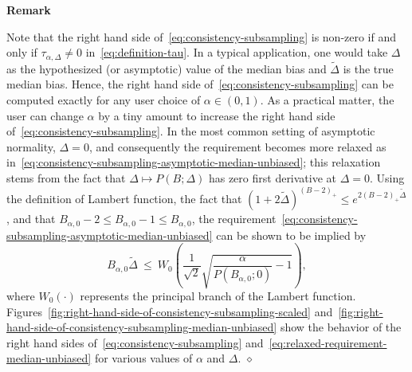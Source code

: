 \documentclass{article}
\newcounter{myalgctr}
\newenvironment{rem}{%
   \vskip1mm\indent%
   \refstepcounter{myalgctr}%
   \textbf{Remark \themyalgctr}%
   }{\hfill$\diamond$\par}  %
\numberwithin{myalgctr}{section}
\begin{document}
\begin{rem}
Note that the right hand side of~\eqref{eq:consistency-subsampling} is non-zero if and only if $\tau_{\alpha,\Delta} \neq 0$ in~\eqref{eq:definition-tau}. In a typical application, one would take $\Delta$ as the hypothesized (or asymptotic) value of the median bias and $\widetilde{\Delta}$ is the true median bias. Hence, the right hand side of~\eqref{eq:consistency-subsampling} can be computed exactly for any user choice of $\alpha\in(0, 1)$. 
As a practical matter, the user can change $\alpha$ by a tiny amount to increase the right hand side of~\eqref{eq:consistency-subsampling}.
In the most common setting of asymptotic normality, $\Delta = 0$, and consequently the requirement becomes more relaxed as in~\eqref{eq:consistency-subsampling-asymptotic-median-unbiased}; this relaxation stems from the fact that $\Delta\mapsto P(B; \Delta)$ has zero first derivative at $\Delta = 0$. 
{\color{black}Using the definition of Lambert function, the fact that $(1 + 2\widetilde{\Delta})^{(B - 2)_+} \le e^{2(B - 2)_+\widetilde{\Delta}}$, and that $B_{\alpha,0} - 2 \le B_{\alpha,0} - 1 \le B_{\alpha,0}$, the requirement~\eqref{eq:consistency-subsampling-asymptotic-median-unbiased} can be shown to be implied by
\begin{equation}\label{eq:relaxed-requirement-median-unbiased}
B_{\alpha,0}\widetilde{\Delta} ~\le~ W_0\left(\frac{1}{\sqrt{2}}\sqrt{\frac{\alpha}{P(B_{\alpha,0}; 0)} - 1}\right),
\end{equation}
where $W_0(\cdot)$ represents the principal branch of the Lambert function.}
{\color{black}Figures~\ref{fig:right-hand-side-of-consistency-subsampling-scaled} and~\ref{fig:right-hand-side-of-consistency-subsampling-median-unbiased} show the behavior of the right hand sides of~\eqref{eq:consistency-subsampling} and~\eqref{eq:relaxed-requirement-median-unbiased} for various values of $\alpha$ and $\Delta$.}
\end{rem}
\end{document}
